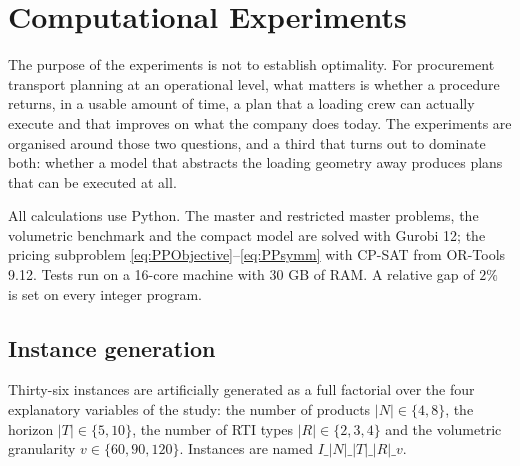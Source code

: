 \begingroup\color{blue}
\section{Computational Experiments}
\label{sec:results}

The purpose of the experiments is not to establish optimality. For
procurement transport planning at an operational level, what matters
is whether a procedure returns, in a usable amount of time, a plan
that a loading crew can actually execute and that improves on what
the company does today. The experiments are organised around those
two questions, and a third that turns out to dominate both: whether a
model that abstracts the loading geometry away produces plans that
can be executed at all.

All calculations use Python. The master and restricted master
problems, the volumetric benchmark and the compact model are solved
with Gurobi 12; the pricing subproblem
\eqref{eq:PPObjective}--\eqref{eq:PPsymm} with CP-SAT from OR-Tools
9.12. Tests run on a 16-core machine with 30 GB of RAM. A relative
gap of $2\%$ is set on every integer program.

\subsection{Instance generation}

Thirty-six instances are artificially generated as a full factorial
over the four explanatory variables of the study: the number of
products $|N|\in\{4,8\}$, the horizon $|T|\in\{5,10\}$, the number of
RTI types $|R|\in\{2,3,4\}$ and the volumetric granularity
$v\in\{60,90,120\}$. Instances are named $I\_|N|\_|T|\_|R|\_v$.

